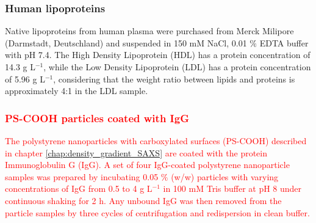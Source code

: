 \subsubsection{Human lipoproteins}

Native lipoproteins from human plasma were purchased from Merck Milipore (Darmstadt, Deutschland) and suspended in 150 mM NaCl, 0.01 $\%$ EDTA buffer with pH 7.4. The High Density Lipoprotein (HDL) has a protein concentration of 14.3 g L$^{-1}$, while the Low Density Lipoprotein (LDL) has a protein concentration of 5.96 g L$^{-1}$, considering that the weight ratio between lipids and proteins is approximately 4:1 in the LDL sample. 

%		


\subsubsection{\textcolor{red}{PS-COOH particles coated with IgG}}

\textcolor{red}{The polystyrene nanoparticles with carboxylated surfaces (PS-COOH) described in chapter \ref{chap:density_gradient_SAXS} are coated with the protein Immunoglobulin G (IgG). A set of four IgG-coated polystyrene nanoparticle samples was prepared by incubating 0.05 $\%$ (w/w) particles with varying concentrations of IgG from 0.5 to 4 g L$^{-1}$ in 100 mM Tris buffer at pH 8 under continuous shaking for 2 h. Any unbound IgG was then removed from the particle samples by three cycles of centrifugation and redispersion in clean buffer.}

